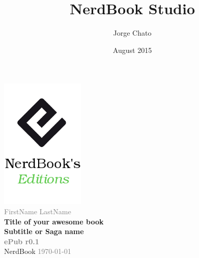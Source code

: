 \documentclass[ebook,12pt,oneside,openany]{memoir}
\author{Jorge Chato}
\title{NerdBook Studio}
\date{August 2015}
\begin{document}




\pagestyle{plain}
{\pagestyle{empty}
  \changepage{5cm}{1cm}{-0.5cm}{-0.5cm}{}{-2cm}{}{}{}
  \begin{center}
    \includegraphics[width=0.3\textwidth,natwidth=190,natheight=298]{../images/edition.png}\\[20cm]
    \textcolor{Gray}{\Large FirstName LastName}\\
    {\Huge \textbf{Title of your awesome book}}\\
    \textbf{Subtitle or Saga name}\\[15cm]
    {\small
      \textcolor{Gray}{\textbf{ePub r0.1}\\}
      NerdBook \textcolor{Gray}{\today}
    }
  \end{center}
  \clearpage
}
\tableofcontents
\end{document}
